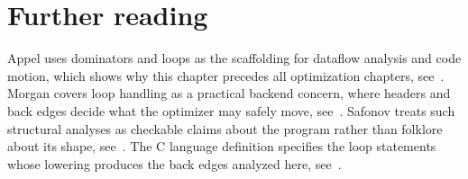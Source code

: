 \section{Further reading}
\label{sec:ch08-further-reading}

Appel uses dominators and loops as the scaffolding for dataflow analysis and code motion, which shows why this chapter precedes all optimization chapters, see~\cite{appel-1998-modern}.
Morgan covers loop handling as a practical backend concern, where headers and back edges decide what the optimizer may safely move, see~\cite{morgan-1998-optimizing}.
Safonov treats such structural analyses as checkable claims about the program rather than folklore about its shape, see~\cite{safonov-2010-trustworthy}.
The C language definition specifies the loop statements whose lowering produces the back edges analyzed here, see~\cite{wg14-2011-c11}.
